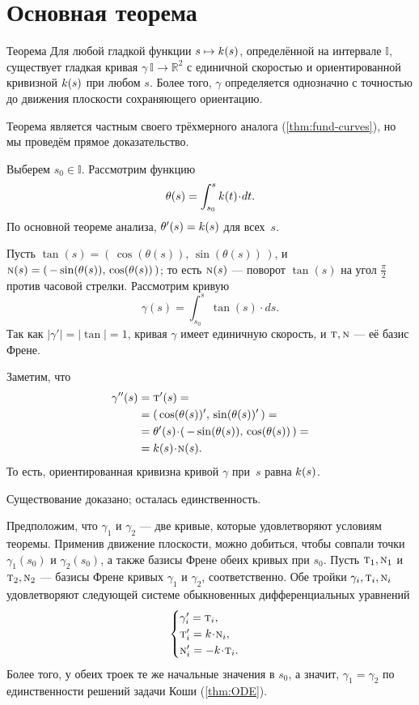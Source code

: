 \section{Основная теорема}

\begin{thm}{Теорема}\label{thm:fund-curves-2D}
Для любой гладкой функции $s\mapsto k(s)$, определённой на интервале $\mathbb{I}$,
существует гладкая кривая $\gamma\:\mathbb{I}\to\mathbb{R}^2$ с единичной скоростью и ориентированной кривизной $k(s)$ при любом $s$.
Более того, $\gamma$ определяется однозначно с точностью до движения плоскости сохраняющего ориентацию.
\end{thm}

Теорема является частным своего трёхмерного аналога (\ref{thm:fund-curves}), но мы проведём прямое доказательство.


Выберем $s_0\in\mathbb{I}$.
Рассмотрим функцию
\[\theta(s)
=
\int_{s_0}^s\skur(t)\cdot dt.\]
По основной теореме анализа, $\theta'(s)\z=\skur(s)$ для всех~$s$.

Пусть 
$\tan(s)=(\,\cos(\theta(s)),\,\sin(\theta(s))\,)$,
и $\text{\sc{n}}(s)=(\,-\sin(\theta(s)),\,\cos(\theta(s))\,)$;
то есть $\text{\sc{n}}(s)$ --- поворот $\tan(s)$ на угол $\tfrac\pi2$ против часовой стрелки.
Рассмотрим кривую 
\[\gamma(s)=\int_{s_0}^s\tan(s)\cdot ds.\]
Так как $|\gamma'|=|\tan|=1$, кривая $\gamma$ имеет единичную скорость, и $\text{\sc{t}},\text{\sc{n}}$ --- её базис Френе. 

Заметим, что
\begin{align*}
\gamma''(s)&=\tan'(s)=
\\
&=(\,\cos(\theta(s))',\,\sin(\theta(s))'\,)=
\\
&=\theta'(s)\cdot (\,-\sin(\theta(s)),\,\cos(\theta(s))\,)=
\\
&=\skur(s)\cdot \norm(s).
\end{align*}
То есть, ориентированная кривизна кривой $\gamma$ при~$s$ равна $k(s)$. 

Существование доказано; осталась единственность.

Предположим, что $\gamma_1$ и $\gamma_2$ --- две кривые, которые удовлетворяют условиям теоремы.
Применив движение плоскости, можно добиться, чтобы совпали точки $\gamma_1(s_0)$ и $\gamma_2(s_0)$, а также базисы Френе обеих кривых при $s_0$.
Пусть $\text{\sc{t}}_1,\text{\sc{n}}_1$ и $\text{\sc{t}}_2,\text{\sc{n}}_2$ --- базисы Френе кривых $\gamma_1$ и $\gamma_2$, соответственно.
Обе тройки $\gamma_i,\text{\sc{t}}_i,\text{\sc{n}}_i$ удовлетворяют следующей системе обыкновенных дифференциальных уравнений 
\[
\begin{cases}
\gamma_i'=\tan_i,
\\
\tan_i'=\skur\cdot\norm_i,
\\
\norm_i'=-\skur\cdot\tan_i.
\end{cases}
\]
Более того, у обеих троек те же начальные значения в $s_0$,
а значит, $\gamma_1=\gamma_2$ по единственности решений задачи Коши (\ref{thm:ODE}).
\qeds

